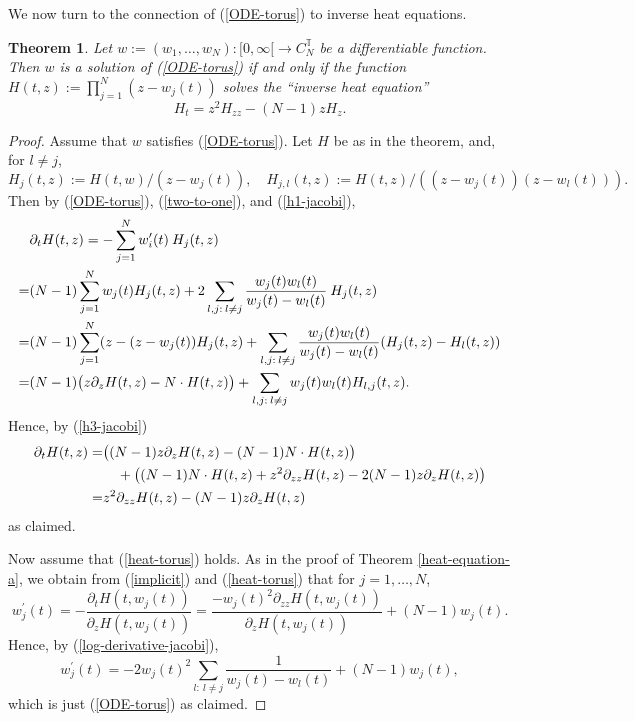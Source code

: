 \documentclass[reqno]{amsart}
\theoremstyle{plain}
\newtheorem{theorem}{Theorem}[section]
\theoremstyle{definition}
\numberwithin{equation}{section}
\begin{document}
We now turn to the connection of (\ref{ODE-torus}) to  inverse heat equations.


\begin{theorem}\label{heat-equation-torus}
  Let $w:=(w_1,\ldots,w_N):[0,\infty[\to C_N^{\mathbb T}$ be a differentiable function.
      Then  $w$ is a solution of (\ref{ODE-torus})
      if and only if the function $H(t,z):=\prod_{j=1}^N (z-w_j(t))$
      solves the ``inverse heat equation''
 \begin{equation}\label{heat-torus}
   H_t= z^2 H_{zz}-(N-1)z H_{z}.
   \end{equation}
 \end{theorem}

 \begin{proof}
   Assume  that $w$ satisfies  (\ref{ODE-torus}).
   Let $H$ be as  in the theorem, and, for $l\ne j$,
   $$  H_j(t,z):=H(t,w)/(z-w_j(t)), \quad
     H_{j,l}(t,z):=H(t,z)/((z-w_j(t))(z-w_l(t))). $$
   Then by (\ref{ODE-torus}), 
   (\ref{two-to-one}),  and (\ref{h1-jacobi}),
\begin{align}\label{h2-torus}
&  \partial_t H(t,z)=   -\sum_{j=1}^N w_i^\prime(t) \> H_j(t,z)\\
     =& (N-1)\sum_{j=1}^N w_j(t)H_j(t,z)+2\sum_{l,j: \> l\ne j} \frac{w_j(t)w_l(t)}{w_j(t)-w_l(t)}\> H_j(t,z)\notag\\
     =&(N-1)\sum_{j=1}^N (z-(z-w_j(t))H_j(t,z)+\sum_{l,j: \> l\ne j} \frac{w_j(t)w_l(t)}{w_j(t)-w_l(t)} ( H_j(t,z)-H_l(t,z))\notag\\
  =&(N-1)\bigl(   z\partial_z H(t,z)-N \cdot H(t,z)\bigr) +\sum_{l,j: \> l\ne j} w_j(t)w_l(t) H_{l,j}(t,z).\notag\end{align}
  Hence, by (\ref{h3-jacobi})
\begin{align}\label{h3-torus}
  \partial_t H(t,z)=&\bigl( (N-1)  z\partial_z H(t,z)-(N-1)N \cdot H(t,z)\bigr)\notag\\ &\quad+
\bigl( (N-1)N \cdot H(t,z)+z^2 \partial_{zz} H(t,z)-2(N-1)  z\partial_z H(t,z)\bigr)\notag\\
=&z^2 \partial_{zz} H(t,z)-(N-1)z\partial_z H(t,z)
\end{align}
 as claimed.

Now assume that (\ref{heat-torus}) holds. As in the proof of Theorem \ref{heat-equation-a}, we obtain from
(\ref{implicit}) and (\ref{heat-torus}) that for $j=1,\ldots,N$,
  $$  w_j^\prime(t)=- \frac{\partial_{t} H(t,w_j(t))}{\partial_{z} H(t,w_j(t))} 
    =
    \frac{ -w_j(t)^2\partial_{zz} H(t,w_j(t))}{\partial_{z} H(t,w_j(t))}+ (N-1) w_j(t).$$
Hence, by  (\ref{log-derivative-jacobi}), 
$$  w_j^\prime(t)=- 2w_j(t)^2\sum_{l: \> l\ne j}   \frac{1}{w_j(t)-w_l(t)}+ (N-1) w_j(t),$$
which is just  (\ref{ODE-torus}) as claimed.
 \end{proof}
\end{document}
